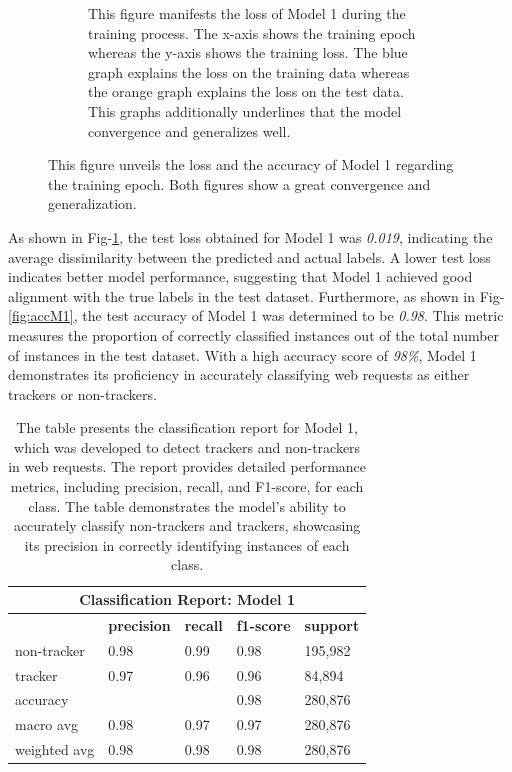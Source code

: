 \begin{figure}[ht!]
\begin{subfigure}[b]{.47\textwidth}
      \caption{This figure manifests the loss of Model 1 during the training process. The x-axis shows the training epoch whereas the y-axis shows
      the training loss. The blue graph explains the loss on the training data whereas the orange graph explains the loss on the test data. 
      This graphs additionally underlines that the model convergence and generalizes well.
    }
      \label{fig:lossM1}
  \end{subfigure}
  \label{}
  \caption{This figure unveils the loss and the accuracy of Model 1 regarding the training epoch. Both figures show a great convergence and generalization.}
\end{figure}
As shown in Fig-\ref{fig:lossM1}, the test loss obtained for Model 1 was \emph{0.019}, indicating the average dissimilarity between the 
predicted and actual labels. A lower test loss indicates better model performance, suggesting that Model 1 achieved good alignment
with the true labels in the test dataset. Furthermore, as shown in Fig-\ref{fig:accM1}, the test accuracy of Model 1 was determined
to be \emph{0.98}. This metric measures the proportion of correctly classified instances out of the total number of instances in
the test dataset. With a high accuracy score of \emph{98\%}, Model 1 demonstrates its proficiency in accurately classifying web
requests as either trackers or non-trackers.

\begin{table}[ht!]
  \begin{center}
    \begin{tabular}[c]{|l|l|l|l|l|}
      \hline
      \multicolumn{5}{|c|}{\textbf{Classification Report: Model 1}} \\
      \hline
      \textbf{} & \textbf{precision} & \textbf{recall} & \textbf{f1-score} & \textbf{support} \\
      \hline
      non-tracker & 0.98 & 0.99 & 0.98 & 195,982 \\
      \hline
      tracker & 0.97 & 0.96 & 0.96 & 84,894 \\
      \hline
      accuracy & & & 0.98 & 280,876 \\
      \hline
      macro avg & 0.98 & 0.97 & 0.97 & 280,876 \\
      \hline
      weighted avg & 0.98 & 0.98 & 0.98 & 280,876 \\
      
      \hline
    \end{tabular}
  \end{center}
  \caption{The table presents the classification report for Model 1, which was developed to detect trackers and non-trackers
  in web requests. The report provides detailed performance metrics, including precision, recall, and F1-score, for each class.
The table demonstrates the model's ability to accurately classify non-trackers and trackers, showcasing
its precision in correctly identifying instances of each class.}
  \label{tab:m1}
\end{table}

